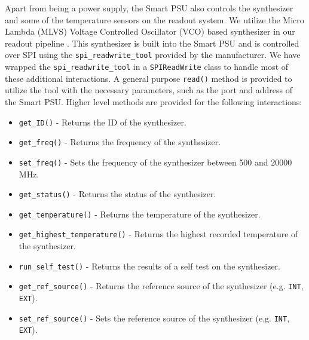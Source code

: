 Apart from being a power supply, the Smart PSU also controls the synthesizer and some of the temperature sensors on the readout system. 
We utilize the Micro Lambda (MLVS) Voltage Controlled Oscillator (VCO) based synthesizer in our readout pipeline \cite{mlvs}. 
This synthesizer is built into the Smart PSU and is controlled over SPI using the \texttt{spi\_readwrite\_tool} provided by the manufacturer.
We have wrapped the \texttt{spi\_readwrite\_tool} in a \texttt{SPIReadWrite} class to handle most of these additional interactions.
A general purpose \texttt{read()} method is provided to utilize the tool with the necessary parameters, such as the port and address of the Smart PSU.
Higher level methods are provided for the following interactions:
\begin{itemize}
    \item \texttt{get\_ID()} - Returns the ID of the synthesizer.
    \item \texttt{get\_freq()} - Returns the frequency of the synthesizer.
    \item \texttt{set\_freq()} - Sets the frequency of the synthesizer between 500 and 20000 MHz.
    \item \texttt{get\_status()} - Returns the status of the synthesizer.
    \item \texttt{get\_temperature()} - Returns the temperature of the synthesizer.
    \item \texttt{get\_highest\_temperature()} - Returns the highest recorded temperature of the synthesizer.
    \item \texttt{run\_self\_test()} - Returns the results of a self test on the synthesizer.
    \item \texttt{get\_ref\_source()} - Returns the reference source of the synthesizer (e.g. \texttt{INT}, \texttt{EXT}).
    \item \texttt{set\_ref\_source()} - Sets the reference source of the synthesizer (e.g. \texttt{INT}, \texttt{EXT}).
\end{itemize}

